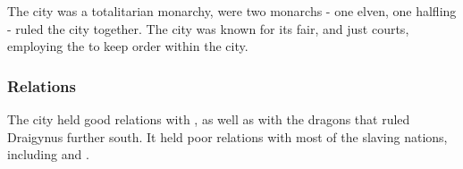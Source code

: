 The city was a totalitarian monarchy, were two monarchs - one elven, one
halfling - ruled the city together. The city was known for its fair, and just
courts, employing the  to keep order within the
city.

\subsubsection{Relations}

The city held good relations with , as well as with the
dragons that ruled Draigynus further south. It held poor relations with most
of the slaving nations, including  and
.
